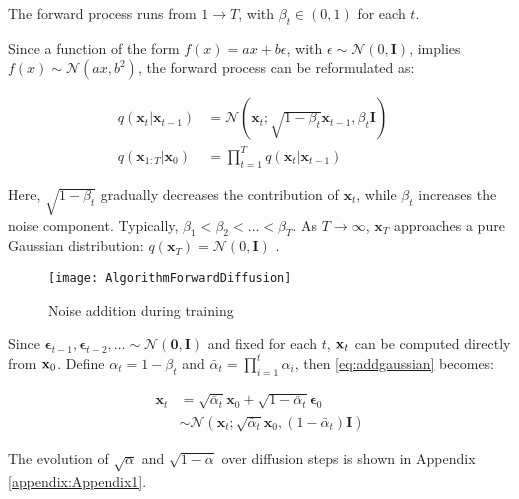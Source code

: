 The forward process runs from $1 \to T$, with $\beta_t \in (0, 1)$ for each $t$.

Since a function of the form $f(x) = ax + b\epsilon$, with $\epsilon \sim \mathcal{N}(0, \mathbf{I})$, implies $f(x) \sim \mathcal{N}(ax, b^2)$, the forward process can be reformulated as:

\begin{equation}
	\label{eq:forward_diffusion_process}
	\begin{aligned}
		q(\mathbf{x}_t \vert \mathbf{x}_{t-1}) &= \mathcal{N}(\mathbf{x}_t; \sqrt{1 - \beta_t} \mathbf{x}_{t-1}, \beta_t\mathbf{I}) \quad \\
		q(\mathbf{x}_{1:T} \vert \mathbf{x}_0) &= \prod^T_{t=1} q(\mathbf{x}_t \vert \mathbf{x}_{t-1})
	\end{aligned}
\end{equation}

Here, $\sqrt{1 - \beta_t}$ gradually decreases the contribution of $\mathbf{x}_t$, while $\beta_t$ increases the noise component. Typically, $\beta_1 < \beta_2 < \dots < \beta_T$. As $T \to \infty$, $\mathbf{x}_T$ approaches a pure Gaussian distribution: $q(\mathbf{x}_T) = \mathcal{N}(0, \mathbf{I})$ \cite{weng2021diffusion}.

\begin{figure}[H]
	\centering
	\texttt{[image: AlgorithmForwardDiffusion]}
	\caption{Noise addition during training}
	\label{fig:AlgorithmForwardDiffusion}
\end{figure}

Since $\boldsymbol{\epsilon}_{t-1}, \boldsymbol{\epsilon}_{t-2}, \dots \sim \mathcal{N}(\mathbf{0}, \mathbf{I})$ and fixed for each $t$, $\mathbf{x}_t$ can be computed directly from $\mathbf{x}_0$. Define $\alpha_t = 1 - \beta_t$ and $\bar{\alpha}_t = \prod_{i=1}^t \alpha_i$, then \autoref{eq:addgaussian} becomes:

\begin{equation}
\begin{aligned}
	\boldsymbol{x}_t &= \sqrt{\bar{\alpha}_t} \boldsymbol{x}_0 + \sqrt{1 - \bar{\alpha}_t} \boldsymbol{\epsilon}_0 \\
	&\sim \mathcal{N}\left(\boldsymbol{x}_t; \sqrt{\bar{\alpha}_t} \boldsymbol{x}_0, \left(1 - \bar{\alpha}_t\right) \textbf{I}\right)
\end{aligned}
\label{eq:tracexzero}
\end{equation}

The evolution of $\sqrt{\alpha}$ and $\sqrt{1 - \alpha}$ over diffusion steps is shown in Appendix \autoref{appendix:Appendix1}.

